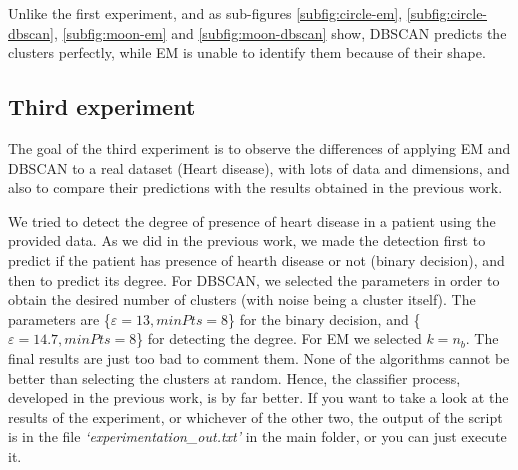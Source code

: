 Unlike the first experiment, and as sub-figures \ref{subfig:circle-em}, \ref{subfig:circle-dbscan}, \ref{subfig:moon-em} and \ref{subfig:moon-dbscan} show, DBSCAN predicts the clusters perfectly, while EM is unable to identify them because of their shape.

\subsection{Third experiment}
The goal of the third experiment is to observe the differences of applying EM and DBSCAN to a real dataset (Heart disease), with lots of data and dimensions, and also to compare their predictions with the results obtained in the previous work.

We tried to detect the degree of presence of heart disease in a patient using the provided data. As we did in the previous work, we made the detection first to predict if the patient has presence of hearth disease or not (binary decision), and then to predict its degree. For DBSCAN, we selected the parameters in order to obtain the desired number of clusters (with noise being a cluster itself). The parameters are \{$\varepsilon = 13, minPts = 8$\} for the binary decision, and \{$\varepsilon = 14.7, minPts = 8$\} for detecting the degree. For EM we selected $k = n_b$. The final results are just too bad to comment them. None of the algorithms cannot be better than selecting the clusters at random. Hence, the classifier process, developed in the previous work, is by far better. If you want to take a look at the results of the experiment, or whichever of the other two, the output of the script is in the file \textit{`experimentation\_out.txt'} in the main folder, or you can just execute it.